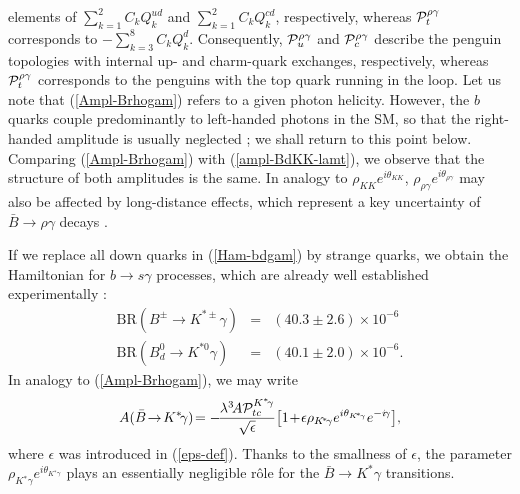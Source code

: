 \documentclass[12pt]{article}
\begin{document}
elements of $\sum_{k=1}^{2}C_k Q_k^{ud}$ and $\sum_{k=1}^{2}C_k Q_k^{cd}$, 
respectively, whereas ${\cal P}_t^{\rho\gamma}$ corresponds to 
$-\sum_{k=3}^{8}C_k Q_k^{d}$. Consequently, ${\cal P}_u^{\rho\gamma}$
and ${\cal P}_c^{\rho\gamma}$ describe the penguin topologies with
internal up- and charm-quark exchanges, respectively, whereas 
${\cal P}_t^{\rho\gamma}$ corresponds to the penguins with the top
quark running in the loop. Let us note that 
(\ref{Ampl-Brhogam}) refers to a given photon helicity. However, 
the $b$ quarks couple predominantly to left-handed photons in 
the SM, so that the right-handed amplitude is usually neglected \cite{GP}; 
we shall return to this point below. Comparing (\ref{Ampl-Brhogam}) with 
(\ref{ampl-BdKK-lamt}), we observe that the structure of both amplitudes is 
the same. In analogy to $\rho_{K\!K} e^{i\theta_{K\!K}}$, 
$\rho_{\rho\gamma}e^{i\theta_{\rho\gamma}}$ may also be affected by 
long-distance effects, which represent a key uncertainty of 
$\bar B\to\rho\gamma$ decays \cite{LHC-Book,GP}. 

If we replace all down quarks in (\ref{Ham-bdgam}) by strange quarks, we obtain the 
Hamiltonian for $b\to s\gamma$ processes, which are already well established 
experimentally \cite{HFAG}:
\begin{eqnarray}
\mbox{BR}(B^\pm\to K^{\ast\pm}\gamma)&=&(40.3\pm2.6)\times 
10^{-6}\label{BR-charged}\\
\mbox{BR}(B_d^0\to K^{\ast0}\gamma)&=&(40.1\pm2.0)\times 
10^{-6}.\label{BR-neutral}
\end{eqnarray}
In analogy to (\ref{Ampl-Brhogam}), we may write
\begin{equation}\label{Ampl-BKastgam}
A(\bar B \!\to\! K^\ast \!\gamma)\!=-\!
\frac{\lambda^3 \! A {\cal P}_{tc}^{K^\ast\!\gamma}}{\sqrt{\epsilon}} \!
\left[1\!+\!\epsilon\rho_{K\!^\ast\!\gamma}e^{i\theta_{K\!^\ast\!\gamma}}
e^{-i\!\gamma}\right]\!,
\end{equation}
where $\epsilon$ was introduced in (\ref{eps-def}). Thanks to the smallness
of $\epsilon$, the parameter 
$\rho_{K\!^\ast\gamma}e^{i\theta_{K\!^\ast\gamma}}$ 
plays an essentially negligible r\^ole for the $\bar B \to K^\ast \gamma$ 
transitions.
\end{document}
